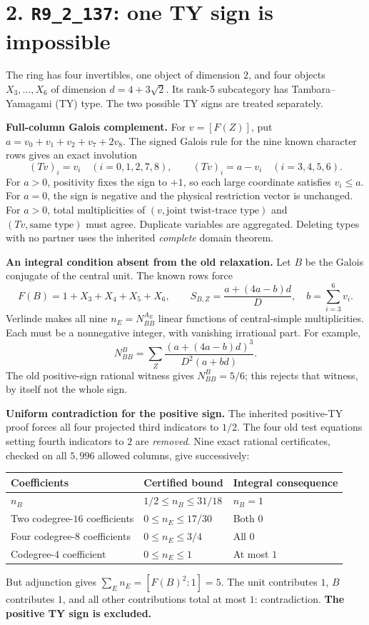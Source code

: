 \documentclass[11pt,a4paper]{article}
\newcommand{\R}[1]{\texttt{#1}}
\begin{document}
\newpage
\section*{2. \R{R9\_2\_137}: one TY sign is impossible}
The ring has four invertibles, one object of dimension $2$, and four objects $X_3,\ldots,X_6$ of dimension $d=4+3\sqrt2$. Its rank-5 subcategory has Tambara--Yamagami (TY) type. The two possible TY signs are treated separately.

\textbf{Full-column Galois complement.} For $v=[F(Z)]$, put $a=v_0+v_1+v_2+v_7+2v_8$. The signed Galois rule for the nine known character rows gives an exact involution
\[
(Tv)_i=v_i\quad(i=0,1,2,7,8),\qquad
(Tv)_i=a-v_i\quad(i=3,4,5,6).
\]
For $a>0$, positivity fixes the sign to $+1$, so each large coordinate satisfies $v_i\le a$. For $a=0$, the sign is negative and the physical restriction vector is unchanged. For $a>0$, total multiplicities of $(v,\text{joint twist-trace type})$ and $(Tv,\text{same type})$ must agree. Duplicate variables are aggregated. Deleting types with no partner uses the inherited \emph{complete} domain theorem.

\textbf{An integral condition absent from the old relaxation.} Let $B$ be the Galois conjugate of the central unit. The known rows force
\[
F(B)=1+X_3+X_4+X_5+X_6,\qquad
S_{B,Z}=\frac{a+(4a-b)d}{D},\quad b=\sum_{i=3}^6v_i.
\]
Verlinde makes all nine $n_E=N_{BB}^{A_E}$ linear functions of central-simple multiplicities. Each must be a nonnegative integer, with vanishing irrational part. For example,
\[
N_{BB}^{B}=\sum_Z\frac{(a+(4a-b)d)^3}{D^2(a+bd)}.
\]
The old positive-sign rational witness gives $N_{BB}^{B}=5/6$; this rejects that witness, by itself not the whole sign.

\textbf{Uniform contradiction for the positive sign.} The inherited positive-TY proof forces all four projected third indicators to $1/2$. The four old test equations setting fourth indicators to $2$ are \emph{removed}. Nine exact rational certificates, checked on all $5{,}996$ allowed columns, give successively:
\begin{center}
\begin{tabular}{@{}lll@{}}\toprule
Coefficients & Certified bound & Integral consequence\\\midrule
$n_B$ & $1/2\le n_B\le31/18$ & $n_B=1$\\
Two codegree-$16$ coefficients & $0\le n_E\le17/30$ & Both $0$\\
Four codegree-$8$ coefficients & $0\le n_E\le3/4$ & All $0$\\
Codegree-$4$ coefficient & $0\le n_E\le1$ & At most $1$\\\bottomrule
\end{tabular}
\end{center}
But adjunction gives $\sum_E n_E=[F(B)^2:1]=5$. The unit contributes $1$, $B$ contributes $1$, and all other contributions total at most $1$: contradiction. \textbf{The positive TY sign is excluded.}
\end{document}
